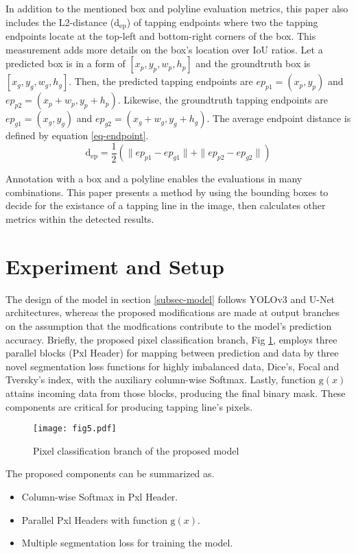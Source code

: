 \documentclass[default,pdflatex,iicol]{sn-jnl}%
\begin{document}
In addition to the mentioned box and polyline evaluation metrics, this paper also includes the L2-distance ($\mathrm{d_{ep}}$) of tapping endpoints where two the tapping endpoints locate at the top-left and bottom-right corners of the box. This measurement adds more details on the box's location over IoU ratios. Let a predicted box is in a form of $[x_p, y_p, w_p, h_p]$ and the groundtruth box is $[x_g, y_g, w_g, h_g]$. Then, the predicted tapping endpoints are $ep_{p1} = (x_p, y_p)$ and $ep_{p2} = (x_p+w_p, y_p+h_p)$. Likewise, the groundtruth tapping endpoints are $ep_{g1} = (x_g, y_g)$ and $ep_{g2} = (x_g+w_g, y_g+h_g)$. The average endpoint distance is defined by equation \ref{eq-endpoint}.
\begin{equation}
\mathrm{d_{ep}} = \frac{1}{2} (\| ep_{p1}- ep_{g1} \| + \| ep_{p2}  - ep_{g2} \|) \label{eq-endpoint}
\end{equation}

Annotation with a box and a polyline enables the evaluations in many combinations. This paper presents a method by using the bounding boxes to decide for the existance of a tapping line in the image, then calculates other metrics within the detected results.

\section{Experiment and Setup}\label{sec-exp}
The design of the model in section \ref{subsec-model} follows YOLOv3 and U-Net architectures, whereas the proposed modifications are made at output branches on the assumption that the modfications contribute to the model's prediction accuracy. Briefly, the proposed pixel classification branch, Fig \ref{fig5-proposedPxlHeader}, employs three parallel blocks (Pxl Header) for mapping between prediction and data by three novel segmentation loss functions for highly imbalanced data, Dice's, Focal and Tversky's index, with the auxiliary column-wise Softmax. Lastly, function $\mathrm{g}(x)$ attains incoming data from those blocks, producing the final binary mask. These components are critical for producing tapping line's pixels.

\begin{figure}[h]%
\centering
\texttt{[image: fig5.pdf]}
\caption{Pixel classification branch of the proposed model}\label{fig5-proposedPxlHeader}
\end{figure}

The proposed components can be summarized as.
\begin{itemize}
  \item Column-wise Softmax in Pxl Header.
  \item Parallel Pxl Headers with function $\mathrm{g}(x)$.
  \item Multiple segmentation loss for training the model.
\end{itemize}
\end{document}
